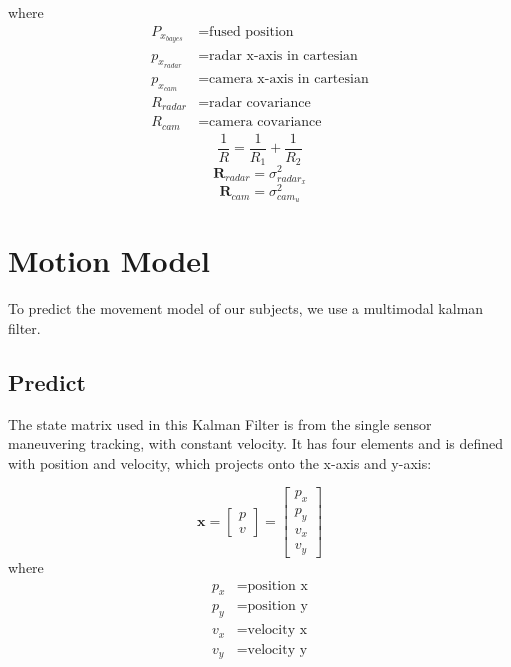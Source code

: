 where
\begin{align*}
    P_{x_{bayes}} &= \text{fused position}\\
    p_{x_{radar}} &= \text{radar x-axis in cartesian}\\
    p_{x_{cam}} &= \text{camera x-axis in cartesian}\\
    R_{radar} &= \text{radar covariance}\\
    R_{cam} &= \text{camera covariance}
\end{align*}
\begin{equation}\label{equ:bayes4}
    \frac{1}{R}=\frac{1}{R_1}+\frac{1}{R_2}
\end{equation}
\begin{equation}\label{equ:2-radar_R}
    \mathbf{R}_{radar} = 
        \sigma_{radar_x}^2 
\end{equation}
\begin{equation}\label{equ:2-R_cam}
    \mathbf{R}_{cam} = 
        \sigma_{cam_u}^2
\end{equation}


\section{Motion Model}\label{sec:2-kalman_filter}
To predict the movement model of our subjects, we use a multimodal kalman filter.
\subsection{Predict}\label{sec:2-predict}
The state matrix used in this Kalman Filter is from the single sensor maneuvering tracking, with constant velocity.
It has four elements and is defined with position and velocity, which projects onto the x-axis and y-axis:

\begin{equation}\label{equ:state_eq}
    \mathbf{x} = 
        \begin{bmatrix} 
        p \\ 
        v 
        \end{bmatrix} = 
        \begin{bmatrix} 
        p_x \\ 
        p_y \\ 
        v_x \\ 
        v_y 
        \end{bmatrix}
\end{equation}
where
\begin{align*}
    p_x &=\text{position x}\\
    p_y &=\text{position y}\\
    v_x &=\text{velocity x}\\
    v_y &=\text{velocity y}\\
\end{align*}

